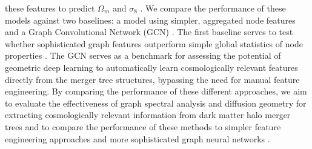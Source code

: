 \documentclass[twocolumn]{aastex631}
\begin{document}
these features to predict $\Omega_m$ and $\sigma_8$ \citep{chandrogómez2025accuracydarkmatterhalo}. We compare the performance of these models against two baselines: a model using simpler, aggregated node features and a Graph Convolutional Network (GCN) \citep{bose2022constructinghighfidelityhalomerger,jung2024mergertreebasedgalaxymatching}. The first baseline serves to test whether sophisticated graph features outperform simple global statistics of node properties \citep{bose2022constructinghighfidelityhalomerger}. The GCN serves as a benchmark for assessing the potential of geometric deep learning to automatically learn cosmologically relevant features directly from the merger tree structures, bypassing the need for manual feature engineering. By comparing the performance of these different approaches, we aim to evaluate the effectiveness of graph spectral analysis and diffusion geometry for extracting cosmologically relevant information from dark matter halo merger trees and to compare the performance of these methods to simpler feature engineering approaches and more sophisticated graph neural networks \citep{bose2022constructinghighfidelityhalomerger,jung2024mergertreebasedgalaxymatching,chandrogómez2025accuracydarkmatterhalo}.
\end{document}
